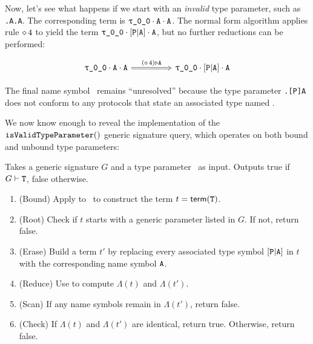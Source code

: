 \documentclass[../generics]{subfiles}
\begin{document}
\begin{example}
Now, let's see what happens if we start with an \emph{invalid} type parameter, such as \texttt{\rT.A.A}. The corresponding term is $\rT \cdot \nA \cdot \nA$. The normal form algorithm applies rule $\diamond\, 4$ to yield the term $\rT\cdot\aPA\cdot\nA$, but no further reductions can be performed:
\begin{ceqn}
\[
\begin{tikzcd}[column sep=huge]
\rT\cdot\nA\cdot\nA\arrow[r, Rightarrow, "(\CRule{4}) \WR \nA"]&
\rT\cdot\aPA\cdot\nA
\end{tikzcd}
\]
\end{ceqn}
The final name symbol \nA\ remains ``unresolved'' because the type parameter \texttt{\rT.[P]A} does not conform to any protocols that state an associated type named \nA.
\end{example}

We now know enough to reveal the implementation of the $\texttt{isValidTypeParameter}()$ generic signature query, which operates on both bound and unbound type parameters:

\begin{algorithm}\label{alg:isValidTypeParameter}
Takes a generic signature $G$ and a type parameter \tT\ as input. Outputs true if $G\vdash\texttt{T}$, false otherwise.
\begin{enumerate}
\item (Bound) Apply  to \tT\ to construct the term $t = \mathsf{term}(\texttt{T})$.
\item (Root) Check if $t$ starts with a generic parameter listed in $G$. If not, return false.
\item (Erase) Build a term $t'$ by replacing every associated type symbol $[\texttt{P}|\texttt{A}]$ in $t$ with the corresponding name symbol $\texttt{A}$.
\item (Reduce) Use  to compute $\Lambda(t)$ and $\Lambda(t')$.
\item (Scan) If any name symbols remain in $\Lambda(t')$, return false.
\item (Check) If $\Lambda(t)$ and $\Lambda(t')$ are identical, return true. Otherwise, return false.
\end{enumerate}
\end{algorithm}
\end{document}
